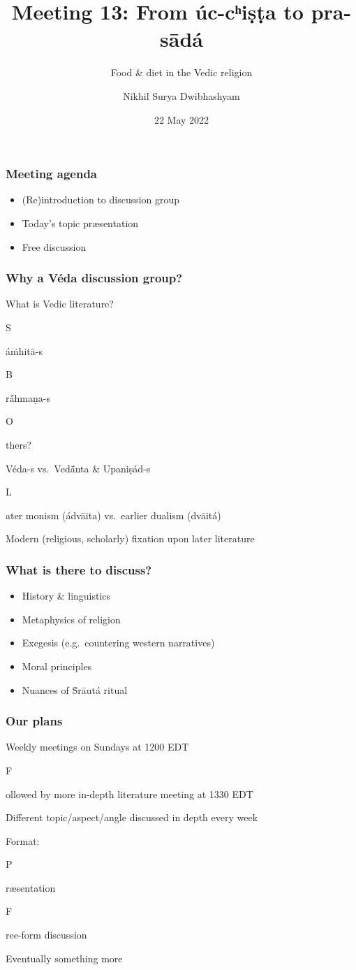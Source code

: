 \documentclass[pdf]{beamer}
\title{Meeting 13: From úc-cʰiṣṭa to pra-sādá}
\subtitle{Food \& diet in the Vedic religion}
\author{Nikhil Surya Dwibhashyam}
\date{22 May 2022}
\newcommand{\Subitem}[1]{{\setlength\itemindent{12pt} \item[-] #1}}
\begin{document}
\frame{\titlepage}

\begin{frame} \frametitle{Meeting agenda}
\begin{itemize}
	\item (Re)introduction to discussion group
	\item Today's topic præsentation
	\item Free discussion
\end{itemize}
\end{frame}

\begin{frame} \frametitle{Why a Véda discussion group?}
\begin{itemize}
	\item What is Vedic literature?
	\Subitem Sáṁhitā-s
	\Subitem Brā́hmaṇa-s
	\Subitem Others?
	\item Véda-s vs.~Vedā́nta \& Upaniṣád-s
	\Subitem Later monism (ádvāita) vs.~earlier dualism (dvāitá)
	\item Modern (religious, scholarly) fixation upon later literature
\end{itemize}
\end{frame}

\begin{frame} \frametitle{What is there to discuss?}
\begin{itemize}
	\item History \& linguistics
	\item Metaphysics of religion
	\item Exegesis (e.g.~countering western narratives)
	\item Moral principles
	\item Nuances of Ṡrāutá ritual
\end{itemize}
\end{frame}

\begin{frame} \frametitle{Our plans}
\begin{itemize}
	\item Weekly meetings on Sundays at 1200 EDT
	\Subitem Followed by more in-depth literature meeting at 1330 EDT
	\item Different topic/aspect/angle discussed in depth every week
	\item Format:
	\Subitem Præsentation
	\Subitem Free-form discussion
	\item Eventually something more
\end{itemize}
\end{frame}
\end{document}
